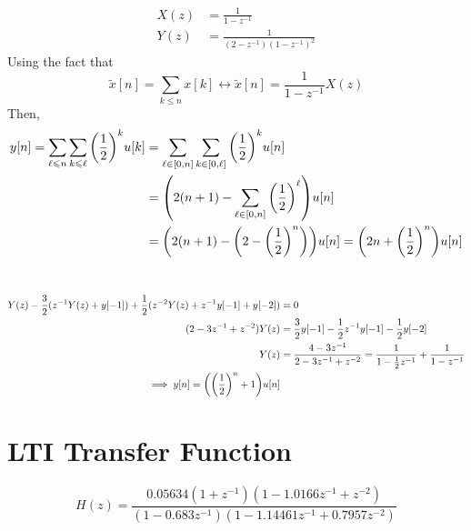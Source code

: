 \documentclass{article}
\begin{document}
\begin{align}
    X(z) &= \frac{1}{1 - z^{-1}} \\
    Y(z) &= \frac{1}{(2 - z^{-1}) (1 - z^{-1})^2}
\end{align}
Using the fact that
\begin{equation}
    \widetilde{x}[n] = \sum_{k \leqslant n} x[k] \longleftrightarrow \widetilde{x}[n] = \frac{1}{1 - z^{-1}} X(z)
\end{equation}
Then,
\begin{align}
    y[n] = \sum_{\ell \leqslant n} \sum_{k \leqslant \ell} \qty(\frac{1}{2})^k u[k] &= \sum_{\ell \in [0, n]} \sum_{k \in [0, \ell]} \qty(\frac{1}{2})^k u[n] \\
    &= \qty(2 (n + 1) - \sum_{\ell \in [0, n]} \qty(\frac{1}{2})^\ell) u[n] \\
    &= \qty(2 (n + 1) - \qty(2 - \qty(\frac{1}{2})^n)) u[n] = \qty(2n + \qty(\frac{1}{2})^n) u[n]
\end{align}

\section{}

\begin{align}
    Y(z) - \frac{3}{2} (z^{-1} Y(z) + y[-1]) + \frac{1}{2} (z^{-2} Y(z) + z^{-1} y[-1] + y[-2]) &= 0 \\
    (2 - 3z^{-1} + z^{-2}) Y(z) &= \frac{3}{2} y[-1] - \frac{1}{2} z^{-1} y[-1] - \frac{1}{2} y[-2] \\
    Y(z) &= \frac{4 - 3z^{-1}}{2 - 3z^{-1} + z^{-2}} = \frac{1}{1 - \frac{1}{2} z^{-1}} + \frac{1}{1 - z^{-1}} \\
    \implies y[n] = \qty(\qty(\frac{1}{2})^n + 1) u[n]
\end{align}

\section{LTI Transfer Function}

\begin{equation}
    H(z) = \frac{\num{0.05634} (1 + z^{-1}) (1 - \num{1.0166} z^{-1} + z^{-2})}{(1 - \num{0.683} z^{-1}) (1 - \num{1.14461} z^{-1} + \num{0.7957} z^{-2})}
\end{equation}

\subsection{}
\end{document}
